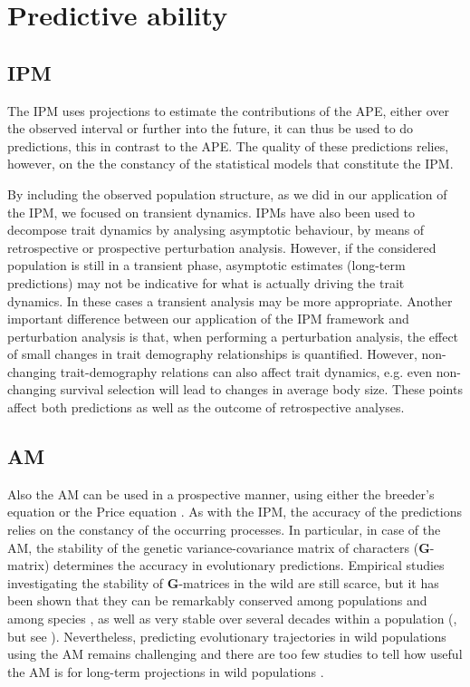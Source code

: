 \section{Predictive ability}
\label{app:pred}

\subsection{IPM}
The IPM uses projections to estimate the contributions of the APE, either over the observed interval or further into the future, it can thus be used to do predictions, this in contrast to the APE. The quality of these predictions relies, however, on the the constancy of the statistical models that constitute the IPM.

By including the observed population structure, as we did in our application of the IPM, we focused on transient dynamics. IPMs have also been used to decompose trait dynamics by analysing asymptotic behaviour, by means of retrospective \citep{Ozgul2010} or prospective \citep{traill2014demography} perturbation analysis. However, if the considered population is still in a transient phase, asymptotic estimates (long-term predictions) may not be indicative for what is actually driving the trait dynamics. In these cases a transient analysis \citep[as outlined by][]{caswell2007} may be more appropriate. Another important difference between our application of the IPM framework and perturbation analysis is that, when performing a perturbation analysis, the effect of small changes in trait demography relationships is quantified. However, non-changing trait-demography relations can also affect trait dynamics, e.g. even non-changing survival selection will lead to changes in average body size. These points affect both predictions as well as the outcome of retrospective analyses.

\subsection{AM}
Also the AM can be used in a prospective manner, using either the breeder's equation or the Price equation \citep{Clayton1957,Lynch1998,Roff2007,Lynch2014}. As with the IPM, the accuracy of the predictions relies on the constancy of the occurring processes. In particular, in case of the AM, the stability of the genetic variance-covariance matrix of characters ($\boldsymbol{G}$-matrix) determines the accuracy in evolutionary predictions. Empirical studies investigating the stability of $\boldsymbol{G}$-matrices in the wild are still scarce, but it has been shown that they can be remarkably conserved among populations \citep{Roff2000} and among species \citep{Arnold2008}, as well as very stable over several decades within a population (\citealp{Garant2008}, but see \citealp{Bjorklund2013}). Nevertheless, predicting evolutionary trajectories in wild populations using the AM remains challenging \citep{Merila2001, Hadfield2010b, Morrissey2010} and there are too few studies to tell how useful the AM is for long-term projections in wild populations \citep{Teplitski2014}.